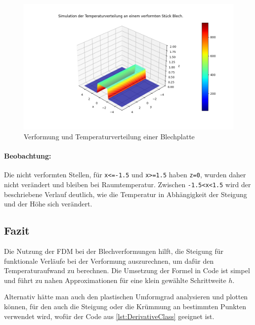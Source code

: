 \begin{figure}[h]
    \centering
    \includegraphics[width=\textwidth]{images/metal_sheet_deformation.png}
    \caption{Verformung und Temperaturverteilung einer Blechplatte}
    \label{fig:MetalSheetDeformation}
\end{figure}

\paragraph{Beobachtung: }
Die nicht verformten Stellen, für \texttt{x<=-1.5} und \texttt{x>=1.5} haben \texttt{z=0}, wurden daher nicht verändert und bleiben bei Raumtemperatur. Zwischen \texttt{-1.5<x<1.5} wird der beschriebene Verlauf deutlich, wie die Temperatur in Abhängigkeit der Steigung und der Höhe sich verändert. 

\subsection{Fazit}
Die Nutzung der FDM bei der Blechverformungen hilft, die Steigung für funktionale Verläufe bei der Verformung auszurechnen, um dafür den Temperaturaufwand zu berechnen. Die Umsetzung der Formel in Code ist simpel und führt zu nahen Approximationen für eine klein gewählte Schrittweite $h$.

Alternativ hätte man auch den plastischen Umformgrad analysieren und plotten können, für den auch die Steigung oder die Krümmung an bestimmten Punkten verwendet wird, wofür der Code aus \ref{lst:DerivativeClass} geeignet ist.